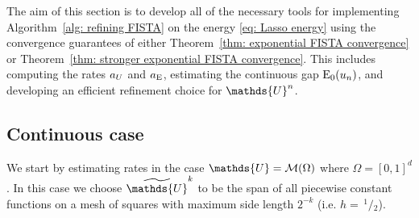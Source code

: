 \documentclass[smallextended]{svjour3}
\let\F\mathds\let\C\mathcal\newcommand{\R}{\F{R}}\newcommand{\A}{\tens{A}}
\renewcommand{\sfrac}[2]{\,^{#1}\!\!/\!_{#2}}
\newcommand{\op}[1]{\operatorname{#1}}
\newcommand{\1}{\F{1}}
\newcommand*{\varf}[1]{%
	\IfEqCase{#1}{%
		{0}{u}%
		{1}{v}%
		{2}{w}%
	}[u#1]%
}
\newcommand*{\Varf}[1]{%
	\IfEqCase{#1}{%
		{0}{U}%
		{1}{V}%
		{2}{W}%
	}[u#1]%
}
\newcommand*{\spcf}[1]{%
	\IfEqCase{#1}{%
		{0}{\F{U}}%
		{1}{\F{V}}%
		{2}{\F{W}}%
	}[\F{U}#1]%
}
\newcommand*{\vars}[1]{%
	\IfEqCase{#1}{%
		{0}{\alpha}%
		{1}{\beta}%
		{2}{\gamma}%
		{3}{a}%
		{4}{b}%
		{5}{c}%
	}[k#1]%
}
\newcommand{\Domain}{\Omega}\newcommand{\domain}{\omega}
\newcommand{\meshsize}{h}
\begin{document}
	The aim of this section is to develop all of the necessary tools for implementing Algorithm~\ref{alg: refining FISTA} on the energy \eqref{eq: Lasso energy} using the convergence guarantees of either Theorem~\ref{thm: exponential FISTA convergence} or Theorem~\ref{thm: stronger exponential FISTA convergence}. This includes computing the rates $\vars3_{\Varf0}$ and $\vars3_{\op{E}}$, estimating the continuous gap $\op{E}_0(\varf0_n)$, and developing an efficient refinement choice for $\spcf0^n$.
	
	\subsection{Continuous case}\label{sec: continuous lasso rate}
	We start by estimating rates in the case $\spcf0=\C M(\Domain)$ where $\Domain =[0,1]^d$. In this case we choose $\tilde{\spcf0}^k$ to be the span of all piecewise constant functions on a mesh of squares with maximum side length $2^{-k}$ (i.e. $\meshsize=\sfrac12$). 
	
\end{document}
